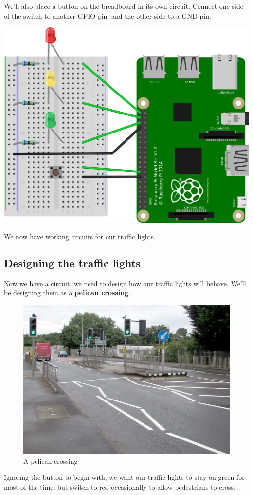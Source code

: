 	We'll also place a button on the breadboard in its own circuit. Connect one side of the switch to another GPIO pin, and the other side to a GND pin.

	\begin{center}
		\includegraphics[width=0.7\linewidth]{McrRaspJam/015_GPIOZero/2_trafficlight/4}
	\end{center}

	We now have working circuits for our traffic lights.
	
	\subsection*{Designing the traffic lights}
	
		Now we have a circuit, we need to design how our traffic lights will behave. We'll be designing them as a \textbf{pelican crossing}.
		
		\begin{figure}[h]
			\centering
			\includegraphics[width=0.5\linewidth]{McrRaspJam/015_GPIOZero/2_trafficlight/pelican}
			\caption{A pelican crossing}
			\label{fig:pelican}
		\end{figure}
		
		Ignoring the button to begin with, we want our traffic lights to stay on green for most of the time, but switch to red occasionally to allow pedestrians to cross.
		
